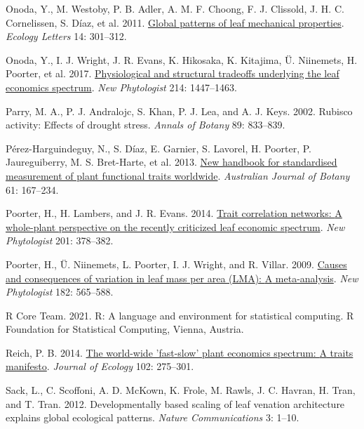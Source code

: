 \documentclass[
  12pt,
  a4paper,
,tablecaptionabove
]{scrartcl}
\newlength{\cslhangindent}
\newenvironment{CSLReferences}[2] %
 {%
  \setlength{\parindent}{0pt}
  \ifodd #1 \everypar{\setlength{\hangindent}{\cslhangindent}}\ignorespaces\fi
  \ifnum #2 > 0
  \setlength{\parskip}{#2\baselineskip}
  \fi
 }%
 {}
\begin{document}
\begin{CSLReferences}{1}{0}
\leavevmode{}%
Onoda, Y., M. Westoby, P. B. Adler, A. M. F. Choong, F. J. Clissold, J.
H. C. Cornelissen, S. Díaz, et al. 2011.
\href{https://doi.org/10.1111/j.1461-0248.2010.01582.x}{Global patterns
of leaf mechanical properties}. \emph{Ecology Letters} 14: 301--312.

\leavevmode{}%
Onoda, Y., I. J. Wright, J. R. Evans, K. Hikosaka, K. Kitajima, Ü.
Niinemets, H. Poorter, et al. 2017.
\href{https://doi.org/10.1111/nph.14496}{Physiological and structural
tradeoffs underlying the leaf economics spectrum}. \emph{New
Phytologist} 214: 1447--1463.

\leavevmode{}%
Parry, M. A., P. J. Andralojc, S. Khan, P. J. Lea, and A. J. Keys. 2002.
Rubisco activity: Effects of drought stress. \emph{Annals of Botany} 89:
833--839.

\leavevmode{}%
Pérez-Harguindeguy, N., S. Díaz, E. Garnier, S. Lavorel, H. Poorter, P.
Jaureguiberry, M. S. Bret-Harte, et al. 2013.
\href{https://doi.org/10.1071/BT12225}{New handbook for standardised
measurement of plant functional traits worldwide}. \emph{Australian
Journal of Botany} 61: 167--234.

\leavevmode{}%
Poorter, H., H. Lambers, and J. R. Evans. 2014.
\href{https://doi.org/10.1111/nph.12547}{Trait correlation networks: {A}
whole-plant perspective on the recently criticized leaf economic
spectrum}. \emph{New Phytologist} 201: 378--382.

\leavevmode{}%
Poorter, H., Ü. Niinemets, L. Poorter, I. J. Wright, and R. Villar.
2009. \href{https://doi.org/10.1111/j.1469-8137.2009.02830.x}{Causes and
consequences of variation in leaf mass per area ({LMA}): {A}
meta-analysis}. \emph{New Phytologist} 182: 565--588.

\leavevmode{}%
R Core Team. 2021. R: {A} language and environment for statistical
computing. {R Foundation for Statistical Computing}, {Vienna, Austria}.

\leavevmode{}%
Reich, P. B. 2014. \href{https://doi.org/10.1111/1365-2745.12211}{The
world-wide 'fast-slow' plant economics spectrum: {A} traits manifesto}.
\emph{Journal of Ecology} 102: 275--301.

\leavevmode{}%
Sack, L., C. Scoffoni, A. D. McKown, K. Frole, M. Rawls, J. C. Havran,
H. Tran, and T. Tran. 2012. Developmentally based scaling of leaf
venation architecture explains global ecological patterns. \emph{Nature
Communications} 3: 1--10.


\end{CSLReferences}
\end{document}
